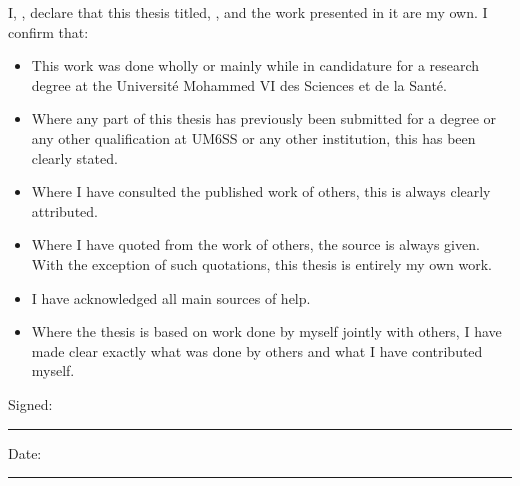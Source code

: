 \noindent I, \authorname, declare that this thesis titled, \ttitle, and the work presented in it are my own. I confirm that:

\begin{itemize}
\item This work was done wholly or mainly while in candidature for a research degree at the Université Mohammed VI des Sciences et de la Santé.
\item Where any part of this thesis has previously been submitted for a degree or any other qualification at UM6SS or any other institution, this has been clearly stated.
\item Where I have consulted the published work of others, this is always clearly attributed.
\item Where I have quoted from the work of others, the source is always given. With the exception of such quotations, this thesis is entirely my own work.
\item I have acknowledged all main sources of help.
\item Where the thesis is based on work done by myself jointly with others, I have made clear exactly what was done by others and what I have contributed myself.
\end{itemize}

\noindent Signed:\\
\rule[0.5em]{25em}{0.5pt}

\noindent Date:\\
\rule[0.5em]{25em}{0.5pt}
